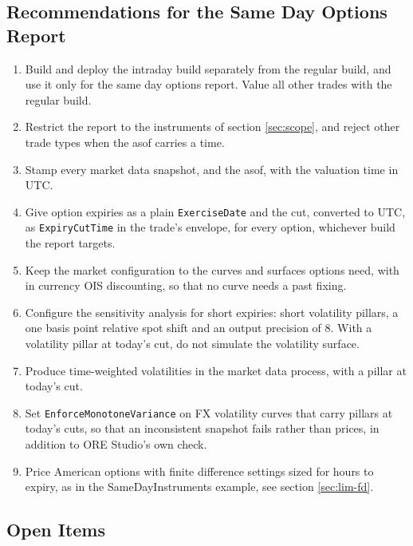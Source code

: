 \documentclass[12pt, a4paper]{article}
\begin{document}
\subsection{Recommendations for the Same Day Options Report}

\begin{enumerate}
\item Build and deploy the intraday build separately from the regular build, and use it only for the same day options
  report. Value all other trades with the regular build.
\item Restrict the report to the instruments of section \ref{sec:scope}, and reject other trade types when the asof
  carries a time.
\item Stamp every market data snapshot, and the asof, with the valuation time in UTC.
\item Give option expiries as a plain \texttt{ExerciseDate} and the cut, converted to UTC, as \texttt{ExpiryCutTime}
  in the trade's envelope, for every option, whichever build the report targets.
\item Keep the market configuration to the curves and surfaces options need, with in currency OIS discounting, so that
  no curve needs a past fixing.
\item Configure the sensitivity analysis for short expiries: short volatility pillars, a one basis point relative spot
  shift and an output precision of 8. With a volatility pillar at today's cut, do not simulate the volatility surface.
\item Produce time-weighted volatilities in the market data process, with a pillar at today's cut.
\item Set \texttt{EnforceMonotoneVariance} on FX volatility curves that carry pillars at today's cuts, so that an
  inconsistent snapshot fails rather than prices, in addition to ORE Studio's own check.
\item Price American options with finite difference settings sized for hours to expiry, as in the SameDayInstruments
  example, see section \ref{sec:lim-fd}.
\end{enumerate}

\subsection{Open Items}
\end{document}
